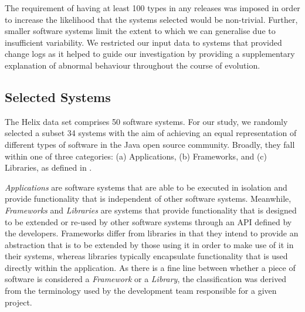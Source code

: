 The requirement of having at least 100 types in any releases was imposed in order to increase the likelihood that the systems selected would be non-trivial. Further, smaller software systems limit the extent to which we can generalise due to insufficient variability. We restricted our input data to systems that provided change logs as it helped to guide our investigation by providing a supplementary explanation of abnormal behaviour throughout the course of evolution.



\subsection{Selected Systems} %
\label{sub:selected_systems}

The Helix data set comprises 50 software systems. For our study, we randomly selected a subset 34 systems with the aim of achieving an equal representation of different types of software in the Java open source community. Broadly, they fall within one of three categories: (a) Applications, (b) Frameworks, and (c) Libraries, as defined in \cite{Vasa10a}.

\emph{Applications} are software systems that are able to be executed in isolation and provide functionality that is independent of other software systems. Meanwhile, \emph{Frameworks} and \emph{Libraries} are systems that provide functionality that is designed to be extended or re-used by other software systems through an API defined by the developers. Frameworks differ from libraries in that they intend to provide an abstraction that is to be extended by those using it in order to make use of it in their systems, whereas libraries typically encapsulate functionality that is used directly within the application. As there is a fine line between whether a piece of software is considered a \emph{Framework} or a \emph{Library}, the classification was derived from the terminology used by the development team responsible for a given project.

